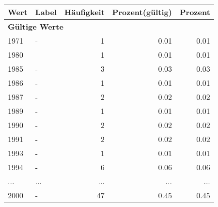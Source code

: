      \begin{longtable}{lXrrr}
     \toprule
     \textbf{Wert} & \textbf{Label} & \textbf{Häufigkeit} & \textbf{Prozent(gültig)} & \textbf{Prozent} \\
     \endhead
     \midrule
     \multicolumn{5}{l}{\textbf{Gültige Werte}}\\
        1971 & \multicolumn{1}{X}{-} & %
          \num{1} &
          \num[round-mode=places,round-precision=2]{0,01} &
          \num[round-mode=places,round-precision=2]{0,01} \\
        1980 & \multicolumn{1}{X}{-} & %
          \num{1} &
          \num[round-mode=places,round-precision=2]{0,01} &
          \num[round-mode=places,round-precision=2]{0,01} \\
        1985 & \multicolumn{1}{X}{-} & %
          \num{3} &
          \num[round-mode=places,round-precision=2]{0,03} &
          \num[round-mode=places,round-precision=2]{0,03} \\
        1986 & \multicolumn{1}{X}{-} & %
          \num{1} &
          \num[round-mode=places,round-precision=2]{0,01} &
          \num[round-mode=places,round-precision=2]{0,01} \\
        1987 & \multicolumn{1}{X}{-} & %
          \num{2} &
          \num[round-mode=places,round-precision=2]{0,02} &
          \num[round-mode=places,round-precision=2]{0,02} \\
        1989 & \multicolumn{1}{X}{-} & %
          \num{1} &
          \num[round-mode=places,round-precision=2]{0,01} &
          \num[round-mode=places,round-precision=2]{0,01} \\
        1990 & \multicolumn{1}{X}{-} & %
          \num{2} &
          \num[round-mode=places,round-precision=2]{0,02} &
          \num[round-mode=places,round-precision=2]{0,02} \\
        1991 & \multicolumn{1}{X}{-} & %
          \num{2} &
          \num[round-mode=places,round-precision=2]{0,02} &
          \num[round-mode=places,round-precision=2]{0,02} \\
        1993 & \multicolumn{1}{X}{-} & %
          \num{1} &
          \num[round-mode=places,round-precision=2]{0,01} &
          \num[round-mode=places,round-precision=2]{0,01} \\
        1994 & \multicolumn{1}{X}{-} & %
          \num{6} &
          \num[round-mode=places,round-precision=2]{0,06} &
          \num[round-mode=places,round-precision=2]{0,06} \\
       ... & ... & ... & ... & ... \\
        2000 & \multicolumn{1}{X}{-} & %
          \num{47} &
          \num[round-mode=places,round-precision=2]{0,45} &
          \num[round-mode=places,round-precision=2]{0,45} \\


\end{longtable}
